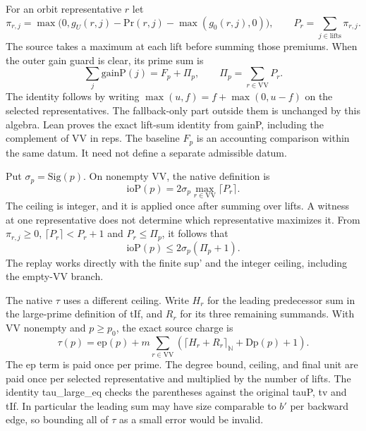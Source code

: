 \documentclass[12pt,letterpaper]{article}
\DeclareRobustCommand{\id}[1]{\mbox{\small\ttfamily #1}}
\begin{document}
For an orbit representative \(r\) let
\[
 \pi_{r,j}=\max\bigl(0,g_U(r,j)-\mathrm{Pr}(r,j)-\max(g_0(r,j),0)\bigr),
 \qquad P_r=\sum_{j\in\mathrm{lifts}}\pi_{r,j}.
\]
The source takes a maximum at each lift before summing those premiums. When the outer gain guard is clear, its prime sum is
\[
                \sum_j\mathrm{gainP}(j)=F_p+\Pi_p,\qquad
                \Pi_p=\sum_{r\in\mathrm{VV}}P_r.
\]
The identity follows by writing \(\max(u,f)=f+\max(0,u-f)\) on the selected representatives. The fallback-only part outside them is unchanged by this algebra. Lean proves the exact lift-sum identity from \id{gainP}, including the complement of \id{VV} in \id{reps}. The baseline \(F_p\) is an accounting comparison within the same datum. It need not define a separate admissible datum.

Put \(\sigma_p=\mathrm{Sig}(p)\). On nonempty \id{VV}, the native definition is
\[
                 \mathrm{ioP}(p)=2\sigma_p\max_{r\in\mathrm{VV}}\lceil P_r\rceil.
\]
The ceiling is integer, and it is applied once after summing over lifts. A witness at one representative does not determine which representative maximizes it. From \(\pi_{r,j}\ge0\), \(\lceil P_r\rceil<P_r+1\) and \(P_r\le\Pi_p\), it follows that
\begin{equation}
               \mathrm{ioP}(p)\le 2\sigma_p(\Pi_p+1).
               \label{eq:window-io-bound}
\end{equation}
The replay works directly with the finite \id{sup'} and the integer ceiling, including the empty-\id{VV} branch.

The native \(\tau\) uses a different ceiling. Write \(H_r\) for the leading predecessor sum in the large-prime definition of \id{tIf}, and \(R_r\) for its three remaining summands. With \id{VV} nonempty and \(p\ge p_0\), the exact source charge is
\begin{equation}
       \tau(p)=\mathrm{ep}(p)+m\sum_{r\in\mathrm{VV}}
             \left(\lceil H_r+R_r\rceil_{\mathbb N}+\mathrm{Dp}(p)+1\right).
             \label{eq:window-tau-exact}
\end{equation}
The \(\mathrm{ep}\) term is paid once per prime. The degree bound, ceiling, and final unit are paid once per selected representative and multiplied by the number of lifts. The identity \id{tau\_large\_eq} checks the parentheses against the original \id{tauP}, \id{tv} and \id{tIf}. In particular the leading sum may have size comparable to \(b'\) per backward edge, so bounding all of \(\tau\) as a small error would be invalid.
\end{document}
